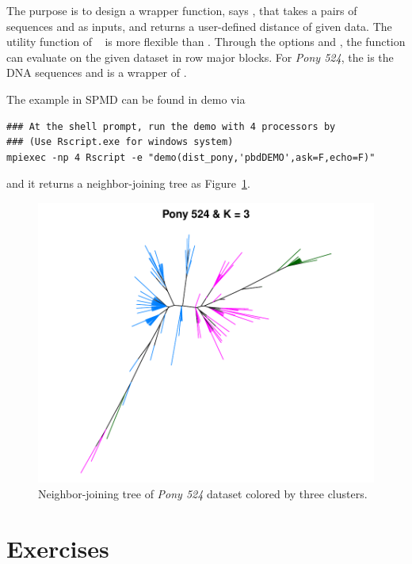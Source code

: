 The purpose is to design a wrapper function, says ,
that takes a pairs of sequences  and  as inputs, and
returns a user-defined distance of given data.
The utility function 
of ~\citep{Chen2012pbdMPIpackage}
is more flexible than .
Through the options  and , the
function can evaluate  on the given dataset  in
row major blocks.
For {\it Pony 524}, the  is the DNA sequences and 
is a wrapper of .

The example in SPMD can be found in demo via
\begin{lstlisting}
### At the shell prompt, run the demo with 4 processors by
### (Use Rscript.exe for windows system)
mpiexec -np 4 Rscript -e "demo(dist_pony,'pbdDEMO',ask=F,echo=F)"
\end{lstlisting}
and it returns a neighbor-joining tree as Figure~\ref{fig:dist_pony}.

\begin{figure}[h!tb]
\centering
 \includegraphics[width=4.5in]{pbdDEMO-include/pics/dist_pony}
\caption{Neighbor-joining tree of {\it Pony 524} dataset colored by three
         clusters.}
\label{fig:dist_pony}
\end{figure}


\section{Exercises}
\label{sec:pairwise_exercise}

